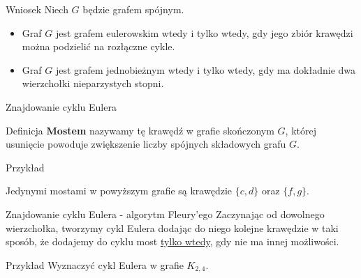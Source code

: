 \documentclass[a4paper,10pt]{beamer}
\begin{document}
\begin{frame}

\begin{block}{Wniosek}
Niech $G$ będzie grafem spójnym.
\begin{itemize}
\item Graf $G$ jest grafem eulerowskim wtedy i tylko wtedy, gdy jego zbiór krawędzi można podzielić na rozłączne cykle.
\item Graf $G$ jest grafem jednobieżnym wtedy i tylko wtedy, gdy ma dokładnie dwa wierzchołki nieparzystych stopni.
\end{itemize}
\end{block}

\end{frame}






\begin{frame}{Znajdowanie cyklu Eulera}
	
	\begin{block}{Definicja}
	 {\bf Mostem} nazywamy tę krawędź w grafie skończonym $G$, której usunięcie powoduje zwiększenie liczby spójnych składowych grafu $G$. 
	\end{block}

\begin{exampleblock}{Przykład}
	\begin{center}
	
	\end{center}
Jedynymi mostami w powyższym grafie są krawędzie $\{c,d\}$ oraz $\{f,g\}$.
\end{exampleblock}

\end{frame}

\begin{frame}
	\begin{block}{Znajdowanie cyklu Eulera - algorytm Fleury'ego}
		Zaczynając od dowolnego wierzchołka, tworzymy cykl Eulera dodając do niego kolejne krawędzie w taki sposób, że dodajemy do cyklu most \underline{tylko wtedy}, gdy nie ma innej możliwości.
	\end{block}

	\begin{exampleblock}{Przykład}
		Wyznaczyć cykl Eulera w grafie $K_{2,4}$.
	\end{exampleblock}
	
\end{frame}
\end{document}
